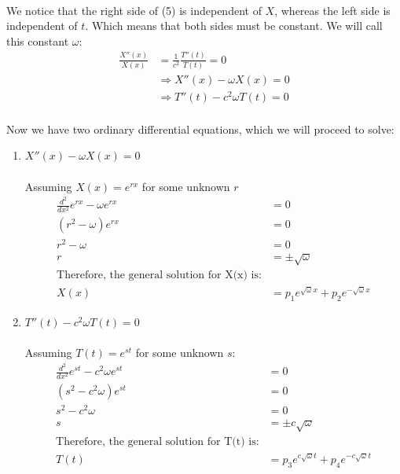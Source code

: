 \documentclass[letter]{article}
\begin{document}
    \paragraph{}We notice that the right side of (5) is independent of $X$, whereas the left side is independent of $t$. Which means that both sides must be constant. We will call this constant $\omega$:
    \begin{equation}
        \begin{split}
            \frac{X''(x)}{X(x)} &= \frac{1}{c^2}\frac{T''(t)}{T(t)} =0\\
            & \Rightarrow X''(x)-\omega X(x) = 0\\
            & \Rightarrow T''(t)-c^2\omega T(t)=0
        \end{split}
    \end{equation}
    \paragraph{}Now we have two ordinary differential equations, which we will proceed to solve:
    \begin{enumerate}
        \item \textbf{$X''(x)-\omega X(x) = 0$}
        \\ \\Assuming $X(x)=e^{rx}$ for some unknown $r$
        \begin{equation}
            \begin{split}
                \frac{d^2}{dx^2}e^{rx}-\omega e^{rx} &= 0\\
                (r^2-\omega)e^{rx} &= 0\\
                r^2 - \omega &= 0\\
                r &= \pm \sqrt{\omega}\\
                \text{Therefore, the general solution for X(x) is:}\\
                X(x) &= p_1e^{\sqrt{\omega}x}+p_2e^{-\sqrt{\omega}x}
            \end{split}
        \end{equation}
        
        \item \textbf{$T''(t)-c^2\omega T(t)=0$}
        \\ \\Assuming $T(t)=e^{st}$ for some unknown $s$:
        \begin{equation}
            \begin{split}
                \frac{d^2}{dx^2}e^{st}-c^2\omega e^{st} &= 0\\
                (s^2-c^2\omega)e^{st} &= 0\\
                s^2 - c^2\omega &= 0\\
                s &= \pm c\sqrt{\omega}\\
                \text{Therefore, the general solution for T(t) is:}\\
                T(t) &= p_3e^{c\sqrt{\omega}t}+p_4e^{-c\sqrt{\omega}t}
            \end{split}
        \end{equation}
    \end{enumerate}
\end{document}

